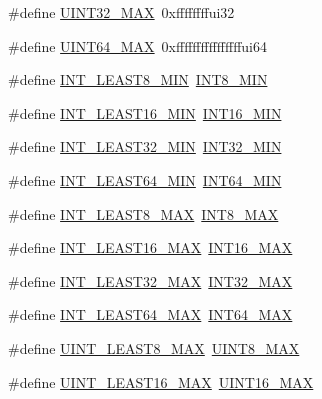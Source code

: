 \begin{DoxyCompactItemize}
\item 
\#define \hyperlink{stdint_8h_ab5eb23180f7cc12b7d6c04a8ec067fdd}{U\-I\-N\-T32\-\_\-\-M\-A\-X}~0xffffffffui32
\item 
\#define \hyperlink{stdint_8h_a30654b4b67d97c42ca3f9b6052dda916}{U\-I\-N\-T64\-\_\-\-M\-A\-X}~0xffffffffffffffffui64
\item 
\#define \hyperlink{stdint_8h_a3e986cad833f63f420962ff60eda87e5}{I\-N\-T\-\_\-\-L\-E\-A\-S\-T8\-\_\-\-M\-I\-N}~\hyperlink{stdint_8h_aadcf2a81af243df333b31efa6461ab8e}{I\-N\-T8\-\_\-\-M\-I\-N}
\item 
\#define \hyperlink{stdint_8h_a1f91bfd5820c2f27af3d260fc75813e1}{I\-N\-T\-\_\-\-L\-E\-A\-S\-T16\-\_\-\-M\-I\-N}~\hyperlink{stdint_8h_ad4e9955955b27624963643eac448118a}{I\-N\-T16\-\_\-\-M\-I\-N}
\item 
\#define \hyperlink{stdint_8h_a2360a536116dd734820a6b5b3d560ce7}{I\-N\-T\-\_\-\-L\-E\-A\-S\-T32\-\_\-\-M\-I\-N}~\hyperlink{stdint_8h_a688eb21a22db27c2b2bd5836943cdcbe}{I\-N\-T32\-\_\-\-M\-I\-N}
\item 
\#define \hyperlink{stdint_8h_ac12b4f6966b57ad82feb683b284b4060}{I\-N\-T\-\_\-\-L\-E\-A\-S\-T64\-\_\-\-M\-I\-N}~\hyperlink{stdint_8h_ab21f12f372f67b8ff0aa3432336ede67}{I\-N\-T64\-\_\-\-M\-I\-N}
\item 
\#define \hyperlink{stdint_8h_aa05109908fb2770f632d2b646b9f85bf}{I\-N\-T\-\_\-\-L\-E\-A\-S\-T8\-\_\-\-M\-A\-X}~\hyperlink{stdint_8h_aaf7f29f45f1a513b4748a4e5014ddf6a}{I\-N\-T8\-\_\-\-M\-A\-X}
\item 
\#define \hyperlink{stdint_8h_a7eb2a8e2a1c65d6c9ad0f86154890baa}{I\-N\-T\-\_\-\-L\-E\-A\-S\-T16\-\_\-\-M\-A\-X}~\hyperlink{stdint_8h_ac58f2c111cc9989c86db2a7dc4fd84ca}{I\-N\-T16\-\_\-\-M\-A\-X}
\item 
\#define \hyperlink{stdint_8h_a5618711a0a54f722190a3a1219e278c2}{I\-N\-T\-\_\-\-L\-E\-A\-S\-T32\-\_\-\-M\-A\-X}~\hyperlink{stdint_8h_a181807730d4a375f848ba139813ce04f}{I\-N\-T32\-\_\-\-M\-A\-X}
\item 
\#define \hyperlink{stdint_8h_a35d0f98a2e507fd1be779d49da92724e}{I\-N\-T\-\_\-\-L\-E\-A\-S\-T64\-\_\-\-M\-A\-X}~\hyperlink{stdint_8h_ad0d744f05898e32d01f73f8af3cd2071}{I\-N\-T64\-\_\-\-M\-A\-X}
\item 
\#define \hyperlink{stdint_8h_a2a80bde77ee1698d0f42f334adad4f2b}{U\-I\-N\-T\-\_\-\-L\-E\-A\-S\-T8\-\_\-\-M\-A\-X}~\hyperlink{stdint_8h_aeb4e270a084ee26fe73e799861bd0252}{U\-I\-N\-T8\-\_\-\-M\-A\-X}
\item 
\#define \hyperlink{stdint_8h_a6ef6a1a518bbf516ca8b0180b11c358f}{U\-I\-N\-T\-\_\-\-L\-E\-A\-S\-T16\-\_\-\-M\-A\-X}~\hyperlink{stdint_8h_a3ea490c9b3617d4479bd80ef93cd5602}{U\-I\-N\-T16\-\_\-\-M\-A\-X}

\end{DoxyCompactItemize}
